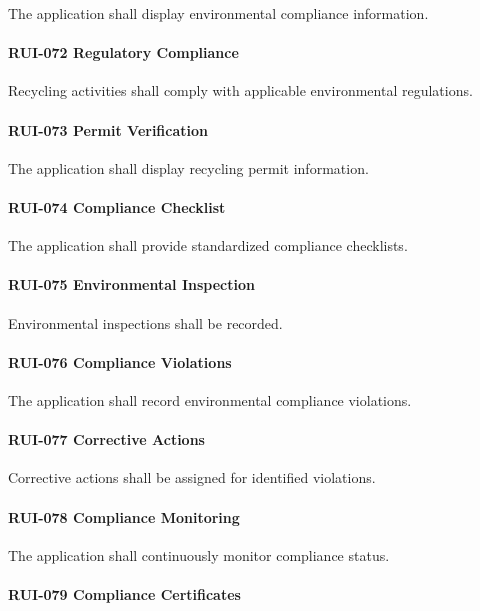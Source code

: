 The application shall display environmental compliance information.

\paragraph{RUI-072 Regulatory Compliance}

Recycling activities shall comply with applicable environmental
regulations.

\paragraph{RUI-073 Permit Verification}

The application shall display recycling permit information.

\paragraph{RUI-074 Compliance Checklist}

The application shall provide standardized compliance checklists.

\paragraph{RUI-075 Environmental Inspection}

Environmental inspections shall be recorded.

\paragraph{RUI-076 Compliance Violations}

The application shall record environmental compliance violations.

\paragraph{RUI-077 Corrective Actions}

Corrective actions shall be assigned for identified violations.

\paragraph{RUI-078 Compliance Monitoring}

The application shall continuously monitor compliance status.

\paragraph{RUI-079 Compliance Certificates}

